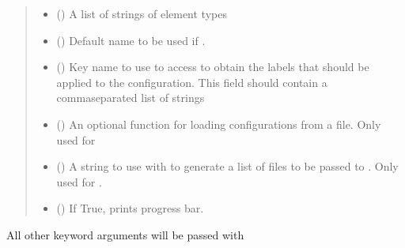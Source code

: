 \documentclass[letterpaper,10pt,english]{sphinxmanual}
\begin{document}
\begin{fulllineitems}
\begin{quote}
\begin{description}
\begin{itemize}
\item {} 
\sphinxAtStartPar
{} () \textendash{} A list of strings of element types

\item {} 
\sphinxAtStartPar
{} () \textendash{} Default name to be used if .

\item {} 
\sphinxAtStartPar
{} () \textendash{} Key name to use to access  to
obtain the labels that should be applied to the configuration. This
field should contain a comma\sphinxhyphen{}separated list of strings

\item {} 
\sphinxAtStartPar
{} () \textendash{} An optional function for loading configurations from a file. Only
used for 

\item {} 
\sphinxAtStartPar
{} () \textendash{} A string to use with  to
generate a list of files to be passed to . Only used
for .

\item {} 
\sphinxAtStartPar
{} () \textendash{} If True, prints progress bar.

\end{itemize}

\end{description}\end{quote}

\sphinxAtStartPar
All other keyword arguments will be passed with

\end{fulllineitems}
\end{document}
